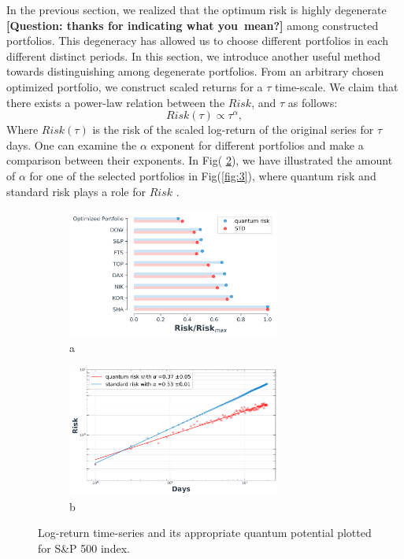 \documentclass[ aip,jmp,reprint]{revtex4-2}
\begin{document}
In the previous section, we realized that the optimum risk is highly
degenerate \textbf{[Question: thanks for indicating what you\ mean?]} among
constructed portfolios. This degeneracy has allowed us to choose different
portfolios in each different distinct periods. In this section, we introduce
another useful method towards distinguishing among degenerate portfolios.
From an arbitrary chosen optimized portfolio, we construct scaled returns
for a $\tau $ time-scale. We claim that there exists a power-law relation
between the $Risk$, and $\tau $ as follows: 
\begin{equation}
Risk(\tau )\propto \tau ^{\alpha },
\end{equation}%
Where $Risk(\tau )$ is the risk of the scaled log-return of the original
series for $\tau $ days. One can examine the $\alpha $ exponent for
different portfolios and make a comparison between their exponents. In Fig(%
\ref{fig3:sub2}), we have illustrated the amount of $\alpha $ for one of the
selected portfolios in Fig(\ref{fig:3}), where quantum risk and standard
risk plays a role for $Risk$ . 
\begin{figure}[tbh]
\begin{subfigure}{0.49\textwidth}
		\centering
		\includegraphics[width=70mm]{fig1.png}
		\caption{a}
		\label{fig3:sub1}
	\end{subfigure}
\begin{subfigure}{0.49\textwidth}
		\centering
		\includegraphics[width=70mm]{fig3_a.png}
		\caption{b}
		\label{fig3:sub2}
	\end{subfigure}
\caption{Log-return time-series and its appropriate quantum potential
plotted for S\&P 500 index.}
\label{fig:4}
\end{figure}
\end{document}

